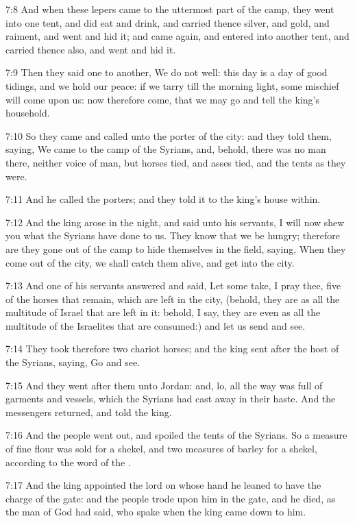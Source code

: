 7:8 And when these lepers came to the uttermost part of the camp, they went into one tent, and did eat and drink, and carried thence silver, and gold, and raiment, and went and hid it; and came again, and entered into another tent, and carried thence also, and went and hid it.

7:9 Then they said one to another, We do not well: this day is a day of good tidings, and we hold our peace: if we tarry till the morning light, some mischief will come upon us: now therefore come, that we may go and tell the king's household.

7:10 So they came and called unto the porter of the city: and they told them, saying, We came to the camp of the Syrians, and, behold, there was no man there, neither voice of man, but horses tied, and asses tied, and the tents as they were.

7:11 And he called the porters; and they told it to the king's house within.

7:12 And the king arose in the night, and said unto his servants, I will now shew you what the Syrians have done to us. They know that we be hungry; therefore are they gone out of the camp to hide themselves in the field, saying, When they come out of the city, we shall catch them alive, and get into the city.

7:13 And one of his servants answered and said, Let some take, I pray thee, five of the horses that remain, which are left in the city, (behold, they are as all the multitude of Israel that are left in it: behold, I say, they are even as all the multitude of the Israelites that are consumed:) and let us send and see.

7:14 They took therefore two chariot horses; and the king sent after the host of the Syrians, saying, Go and see.

7:15 And they went after them unto Jordan: and, lo, all the way was full of garments and vessels, which the Syrians had cast away in their haste. And the messengers returned, and told the king.

7:16 And the people went out, and spoiled the tents of the Syrians. So a measure of fine flour was sold for a shekel, and two measures of barley for a shekel, according to the word of the \LORD.

7:17 And the king appointed the lord on whose hand he leaned to have the charge of the gate: and the people trode upon him in the gate, and he died, as the man of God had said, who spake when the king came down to him.

